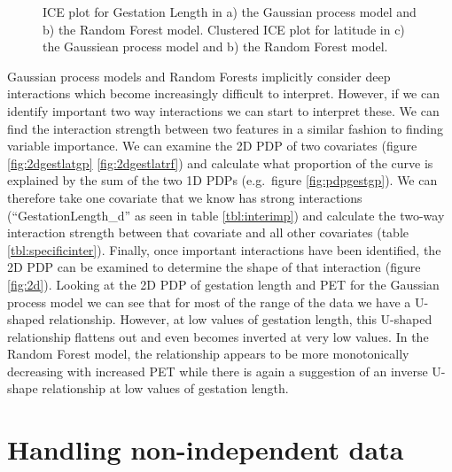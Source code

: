 \documentclass[10pt,]{article}
\begin{document}
\begin{figure}[t!]
  \centering


  \label{fig:ice}
  \caption{
    ICE plot for Gestation Length in a) the Gaussian process model and b) the Random Forest model.
    Clustered ICE plot for latitude in c) the Gaussiean process model and b) the Random Forest model.
  }
\end{figure}


Gaussian process models and Random Forests implicitly consider deep interactions which become increasingly difficult to interpret.
However, if we can identify important two way interactions we can start to interpret these.
We can find the interaction strength between two features in a similar fashion to finding variable importance.
We can examine the 2D PDP of two covariates (figure \ref{fig:2dgestlatgp} \ref{fig:2dgestlatrf}) and calculate what proportion of the curve is explained by the sum of the two 1D PDPs (e.g.~figure \ref{fig:pdpgestgp}).
We can therefore take one covariate that we know has strong interactions (``GestationLength\_d'' as seen in table \ref{tbl:interimp}) and calculate the two-way interaction strength between that covariate and all other covariates (table \ref{tbl:specificinter}).
Finally, once important interactions have been identified, the 2D PDP can be examined to determine the shape of that interaction (figure \ref{fig:2d}).
Looking at the 2D PDP of gestation length and PET for the Gaussian process model we can see that for most of the range of the data we have a U-shaped relationship.
However, at low values of gestation length, this U-shaped relationship flattens out and even becomes inverted at very low values.
In the Random Forest model, the relationship appears to be more monotonically decreasing with increased PET while there is again a suggestion of an inverse U-shape relationship at low values of gestation length.



\section{Handling non-independent data}\label{handling-non-independent-data}
\end{document}
